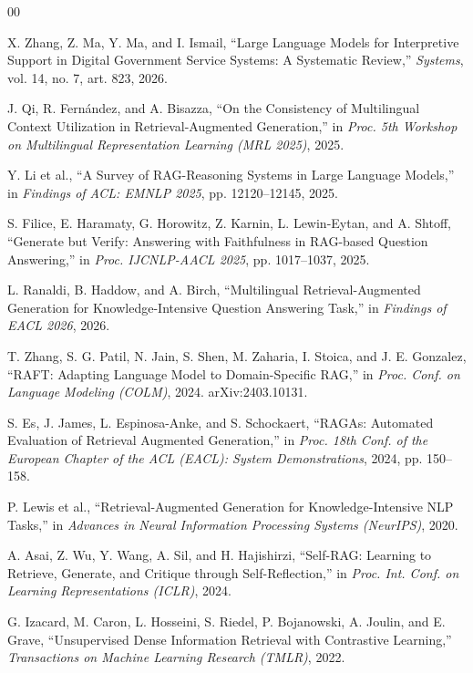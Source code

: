 \documentclass[conference]{IEEEtran}
\begin{document}
\begin{thebibliography}{00}

 X. Zhang, Z. Ma, Y. Ma, and I. Ismail, ``Large Language Models for Interpretive Support in Digital Government Service Systems: A Systematic Review,'' \emph{Systems}, vol. 14, no. 7, art. 823, 2026.

 J. Qi, R. Fern\'andez, and A. Bisazza, ``On the Consistency of Multilingual Context Utilization in Retrieval-Augmented Generation,'' in \emph{Proc. 5th Workshop on Multilingual Representation Learning (MRL 2025)}, 2025.

 Y. Li et al., ``A Survey of RAG-Reasoning Systems in Large Language Models,'' in \emph{Findings of ACL: EMNLP 2025}, pp. 12120--12145, 2025.

 S. Filice, E. Haramaty, G. Horowitz, Z. Karnin, L. Lewin-Eytan, and A. Shtoff, ``Generate but Verify: Answering with Faithfulness in RAG-based Question Answering,'' in \emph{Proc. IJCNLP-AACL 2025}, pp. 1017--1037, 2025.

 L. Ranaldi, B. Haddow, and A. Birch, ``Multilingual Retrieval-Augmented Generation for Knowledge-Intensive Question Answering Task,'' in \emph{Findings of EACL 2026}, 2026.

 T. Zhang, S. G. Patil, N. Jain, S. Shen, M. Zaharia, I. Stoica, and J. E. Gonzalez, ``RAFT: Adapting Language Model to Domain-Specific RAG,'' in \emph{Proc. Conf. on Language Modeling (COLM)}, 2024. arXiv:2403.10131.

 S. Es, J. James, L. Espinosa-Anke, and S. Schockaert, ``RAGAs: Automated Evaluation of Retrieval Augmented Generation,'' in \emph{Proc. 18th Conf. of the European Chapter of the ACL (EACL): System Demonstrations}, 2024, pp. 150--158.

 P. Lewis et al., ``Retrieval-Augmented Generation for Knowledge-Intensive NLP Tasks,'' in \emph{Advances in Neural Information Processing Systems (NeurIPS)}, 2020.

 A. Asai, Z. Wu, Y. Wang, A. Sil, and H. Hajishirzi, ``Self-RAG: Learning to Retrieve, Generate, and Critique through Self-Reflection,'' in \emph{Proc. Int. Conf. on Learning Representations (ICLR)}, 2024.

 G. Izacard, M. Caron, L. Hosseini, S. Riedel, P. Bojanowski, A. Joulin, and E. Grave, ``Unsupervised Dense Information Retrieval with Contrastive Learning,'' \emph{Transactions on Machine Learning Research (TMLR)}, 2022.


\end{thebibliography}
\end{document}
